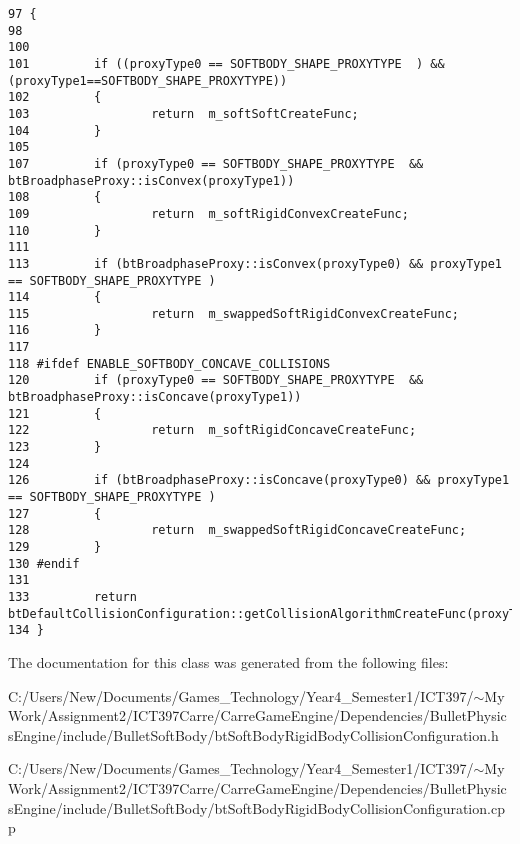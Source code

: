 \begin{Code}\begin{verbatim}97 {
98 
100 
101         if ((proxyType0 == SOFTBODY_SHAPE_PROXYTYPE  ) && (proxyType1==SOFTBODY_SHAPE_PROXYTYPE))
102         {
103                 return  m_softSoftCreateFunc;
104         }
105 
107         if (proxyType0 == SOFTBODY_SHAPE_PROXYTYPE  && btBroadphaseProxy::isConvex(proxyType1))
108         {
109                 return  m_softRigidConvexCreateFunc;
110         }
111 
113         if (btBroadphaseProxy::isConvex(proxyType0) && proxyType1 == SOFTBODY_SHAPE_PROXYTYPE )
114         {
115                 return  m_swappedSoftRigidConvexCreateFunc;
116         }
117 
118 #ifdef ENABLE_SOFTBODY_CONCAVE_COLLISIONS
120         if (proxyType0 == SOFTBODY_SHAPE_PROXYTYPE  && btBroadphaseProxy::isConcave(proxyType1))
121         {
122                 return  m_softRigidConcaveCreateFunc;
123         }
124 
126         if (btBroadphaseProxy::isConcave(proxyType0) && proxyType1 == SOFTBODY_SHAPE_PROXYTYPE )
127         {
128                 return  m_swappedSoftRigidConcaveCreateFunc;
129         }
130 #endif
131 
133         return btDefaultCollisionConfiguration::getCollisionAlgorithmCreateFunc(proxyType0,proxyType1);
134 }
\end{verbatim}
\end{Code}




The documentation for this class was generated from the following files:\begin{CompactItemize}
\item 
C:/Users/New/Documents/Games\_\-Technology/Year4\_\-Semester1/ICT397/$\sim$My Work/Assignment2/ICT397Carre/CarreGameEngine/Dependencies/BulletPhysicsEngine/include/BulletSoftBody/btSoftBodyRigidBodyCollisionConfiguration.h\item 
C:/Users/New/Documents/Games\_\-Technology/Year4\_\-Semester1/ICT397/$\sim$My Work/Assignment2/ICT397Carre/CarreGameEngine/Dependencies/BulletPhysicsEngine/include/BulletSoftBody/btSoftBodyRigidBodyCollisionConfiguration.cpp\end{CompactItemize}

